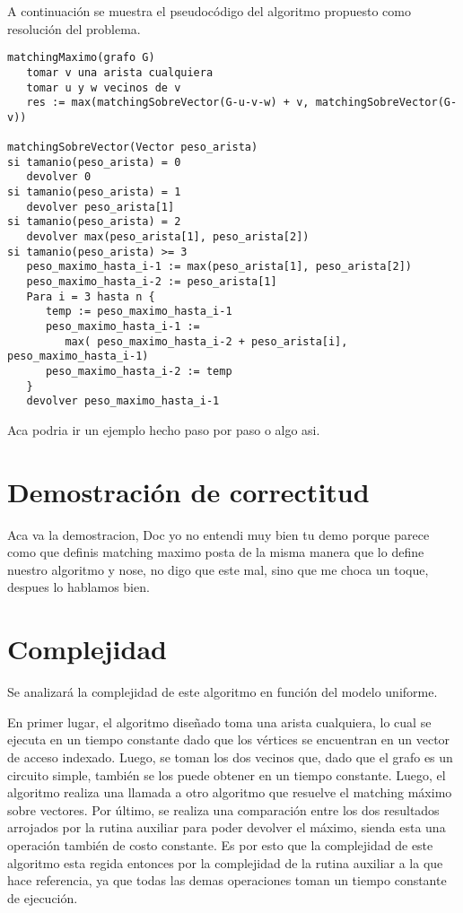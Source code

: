 \documentclass[a4paper, 12pt]{article}
\begin{document}
A continuaci\'on se muestra el pseudoc\'odigo del algoritmo propuesto como resoluci\'on del problema.


\begin{verbatim}
matchingMaximo(grafo G)
   tomar v una arista cualquiera
   tomar u y w vecinos de v
   res := max(matchingSobreVector(G-u-v-w) + v, matchingSobreVector(G-v))

matchingSobreVector(Vector peso_arista)
si tamanio(peso_arista) = 0
   devolver 0
si tamanio(peso_arista) = 1
   devolver peso_arista[1]
si tamanio(peso_arista) = 2
   devolver max(peso_arista[1], peso_arista[2])
si tamanio(peso_arista) >= 3
   peso_maximo_hasta_i-1 := max(peso_arista[1], peso_arista[2]) 
   peso_maximo_hasta_i-2 := peso_arista[1]
   Para i = 3 hasta n {
      temp := peso_maximo_hasta_i-1
      peso_maximo_hasta_i-1 := 
         max( peso_maximo_hasta_i-2 + peso_arista[i], peso_maximo_hasta_i-1)
      peso_maximo_hasta_i-2 := temp
   }
   devolver peso_maximo_hasta_i-1

\end{verbatim}

Aca podria ir un ejemplo hecho paso por paso o algo asi.

\section*{Demostraci\'on de correctitud}

Aca va la demostracion, Doc yo no entendi muy bien tu demo porque parece como que definis matching maximo posta de la misma manera que lo define nuestro algoritmo y nose, no digo que este mal, sino que me choca un toque, despues lo hablamos bien.


\section*{Complejidad}

Se analizar\'a la complejidad de este algoritmo en funci\'on del modelo uniforme.

En primer lugar, el algoritmo dise\~{n}ado toma una arista cualquiera, lo cual se ejecuta en un tiempo constante dado que los v\'ertices se encuentran en un vector de acceso indexado. Luego, se toman los dos vecinos que, dado que el grafo es un circuito simple, tambi\'en se los puede obtener en un tiempo constante. Luego, el algoritmo realiza una llamada a otro algoritmo que resuelve el matching m\'aximo sobre vectores. Por \'ultimo, se realiza una comparaci\'on entre los dos resultados arrojados por la rutina auxiliar para poder devolver el m\'aximo, sienda esta una operaci\'on tambi\'en de costo constante. Es por esto que la complejidad de este algoritmo esta regida entonces por la complejidad de la rutina auxiliar a la que hace referencia, ya que todas las demas operaciones toman un tiempo constante de ejecuci\'on.
\end{document}
